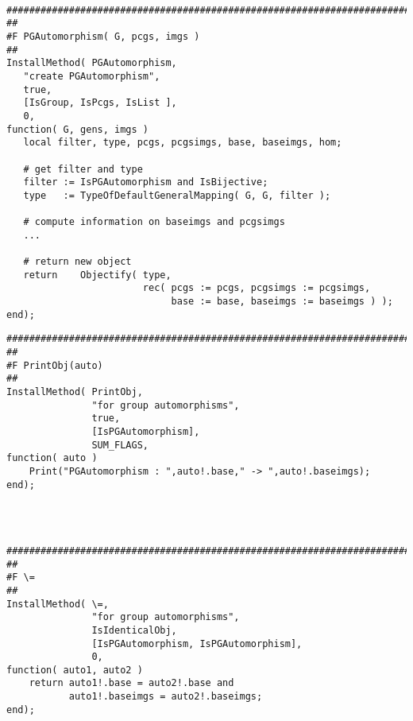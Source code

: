 \documentclass{slides}
\begin{document}
\newpage

{\tiny
\begin{verbatim}

#########################################################################
##
#F PGAutomorphism( G, pcgs, imgs )
##
InstallMethod( PGAutomorphism,
   "create PGAutomorphism",
   true,
   [IsGroup, IsPcgs, IsList ],
   0,
function( G, gens, imgs )
   local filter, type, pcgs, pcgsimgs, base, baseimgs, hom;

   # get filter and type
   filter := IsPGAutomorphism and IsBijective;
   type   := TypeOfDefaultGeneralMapping( G, G, filter );

   # compute information on baseimgs and pcgsimgs
   ...

   # return new object
   return    Objectify( type, 
                        rec( pcgs := pcgs, pcgsimgs := pcgsimgs,
                             base := base, baseimgs := baseimgs ) );
end);
\end{verbatim}}
\newpage

{\tiny
\begin{verbatim}
#########################################################################
##
#F PrintObj(auto)
##
InstallMethod( PrintObj,
               "for group automorphisms",
               true,
               [IsPGAutomorphism],
               SUM_FLAGS,
function( auto )
    Print("PGAutomorphism : ",auto!.base," -> ",auto!.baseimgs);
end);




#########################################################################
##
#F \=
##
InstallMethod( \=,
               "for group automorphisms",
               IsIdenticalObj,
               [IsPGAutomorphism, IsPGAutomorphism],
               0,
function( auto1, auto2 )
    return auto1!.base = auto2!.base and 
           auto1!.baseimgs = auto2!.baseimgs;
end);
\end{verbatim}}


\end{document}
